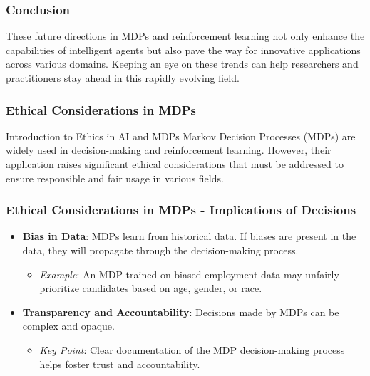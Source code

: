 \documentclass[aspectratio=169]{beamer}
\begin{document}
\begin{frame}[fragile]
    \frametitle{Conclusion}
    These future directions in MDPs and reinforcement learning not only enhance the capabilities of intelligent agents but also pave the way for innovative applications across various domains. Keeping an eye on these trends can help researchers and practitioners stay ahead in this rapidly evolving field.
\end{frame}

\begin{frame}[fragile]
    \frametitle{Ethical Considerations in MDPs}
    \begin{block}{Introduction to Ethics in AI and MDPs}
        Markov Decision Processes (MDPs) are widely used in decision-making and reinforcement learning. However, their application raises significant ethical considerations that must be addressed to ensure responsible and fair usage in various fields.
    \end{block}
\end{frame}

\begin{frame}[fragile]
    \frametitle{Ethical Considerations in MDPs - Implications of Decisions}
    \begin{itemize}
        \item \textbf{Bias in Data}: MDPs learn from historical data. If biases are present in the data, they will propagate through the decision-making process.
        \begin{itemize}
            \item \textit{Example}: An MDP trained on biased employment data may unfairly prioritize candidates based on age, gender, or race.
        \end{itemize}
        
        \item \textbf{Transparency and Accountability}: Decisions made by MDPs can be complex and opaque.
        \begin{itemize}
            \item \textit{Key Point}: Clear documentation of the MDP decision-making process helps foster trust and accountability.
        \end{itemize}
    \end{itemize}
\end{frame}
\end{document}
